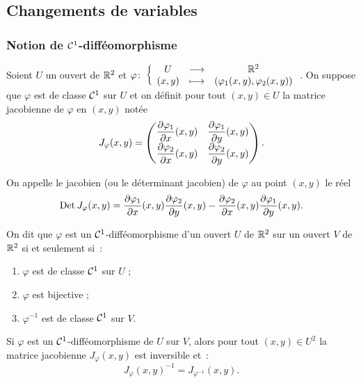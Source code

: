 \subsection{Changements de variables}

\subsubsection{Notion de \(\mathcal{C}^{1}\)-difféomorphisme}

\begin{defdef}
  Soient \(U\) un ouvert de \(\mathbb{R}^2\) et \(\varphi\colon \left\{\begin{array}{ccc} U & \longrightarrow &\mathbb{R}^2\\ (x,y) & \longmapsto & (\varphi_1(x,y),\varphi_2(x,y)) \end{array} \right.\). On suppose que \(\varphi\) est de classe \(\mathcal{C}^{1}\) sur \(U\) et on définit pour tout \((x,y) \in U\) la matrice jacobienne de \(\varphi\) en \((x,y)\) notée
  \begin{equation}
    J_\varphi(x,y) = \begin{pmatrix} \dfrac{\partial{} \varphi_1}{\partial{} x}(x,y) & \dfrac{\partial{} \varphi_1}{\partial{} y}(x,y) \\ \dfrac{\partial{} \varphi_2}{\partial{} x}(x,y) & \dfrac{\partial{} \varphi_2}{\partial{} y}(x,y) \end{pmatrix}.
  \end{equation}

  On appelle le jacobien (ou le déterminant jacobien) de \(\varphi\) au point \((x,y)\) le réel
  \begin{equation}
    \operatorname{Det} J_\varphi(x,y) = \dfrac{\partial{} \varphi_1}{\partial{} x}(x,y) \dfrac{\partial{} \varphi_2}{\partial{} y}(x,y) - \dfrac{\partial{} \varphi_2}{\partial{} x}(x,y) \dfrac{\partial{} \varphi_1}{\partial{} y}(x,y).
  \end{equation}
\end{defdef}
%
\begin{defdef}
  On dit que \(\varphi\) est un \(\mathcal{C}^{1}\)-difféomorphisme d'un ouvert \(U\) de \(\mathbb{R}^2\) sur un ouvert \(V\) de \(\mathbb{R}^2\) si et seulement si~:
  \begin{enumerate}
  \item \(\varphi\) est de classe \(\mathcal{C}^{1}\) sur \(U\) ;
  \item \(\varphi\) est bijective ;
  \item \(\varphi^{-1}\) est de classe \(\mathcal{C}^{1}\) sur \(V\).
  \end{enumerate}
\end{defdef}
%
\begin{prop}[Admise]
  Si \(\varphi\) est un \(\mathcal{C}^{1}\)-difféomorphisme de \(U\) sur \(V\), alors pour tout \((x,y) \in U^2\) la matrice jacobienne \(J_\varphi(x,y)\) est inversible et~:
  \begin{equation}
    J_\varphi(x,y)^{-1} = J_{\varphi^{-1}}(x,y).
  \end{equation}
\end{prop}

